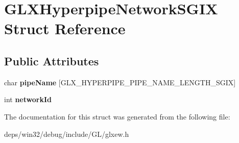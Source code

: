 \hypertarget{struct_g_l_x_hyperpipe_network_s_g_i_x}{}\section{G\+L\+X\+Hyperpipe\+Network\+S\+G\+I\+X Struct Reference}
\label{struct_g_l_x_hyperpipe_network_s_g_i_x}
\subsection*{Public Attributes}
\begin{DoxyCompactItemize}
\item 
\hypertarget{struct_g_l_x_hyperpipe_network_s_g_i_x_a6338b9717fa895aec16b932f2ef693ed}{}char {\bfseries pipe\+Name} \mbox{[}G\+L\+X\+\_\+\+H\+Y\+P\+E\+R\+P\+I\+P\+E\+\_\+\+P\+I\+P\+E\+\_\+\+N\+A\+M\+E\+\_\+\+L\+E\+N\+G\+T\+H\+\_\+\+S\+G\+I\+X\mbox{]}\label{struct_g_l_x_hyperpipe_network_s_g_i_x_a6338b9717fa895aec16b932f2ef693ed}

\item 
\hypertarget{struct_g_l_x_hyperpipe_network_s_g_i_x_a81393053988b32fadb0b21615024add1}{}int {\bfseries network\+Id}\label{struct_g_l_x_hyperpipe_network_s_g_i_x_a81393053988b32fadb0b21615024add1}

\end{DoxyCompactItemize}


The documentation for this struct was generated from the following file\+:\begin{DoxyCompactItemize}
\item 
deps/win32/debug/include/\+G\+L/glxew.\+h\end{DoxyCompactItemize}

